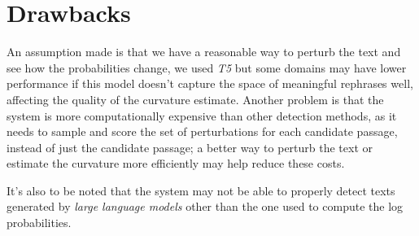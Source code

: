 \section{Drawbacks}

An assumption made is that we have a reasonable way to perturb the text and see how the probabilities change, we used \textit{T5} but some domains may have lower performance if this model doesn't capture the space of meaningful rephrases well, affecting the quality of the curvature estimate. Another problem is that the system is more computationally expensive than other detection methods, as it needs to sample and score the set of perturbations for each candidate passage, instead of just the candidate passage; a better way to perturb the text or estimate the curvature more efficiently may help reduce these costs.

It's also to be noted that the system may not be able to properly detect texts generated by \textit{large language models} other than the one used to compute the log probabilities.